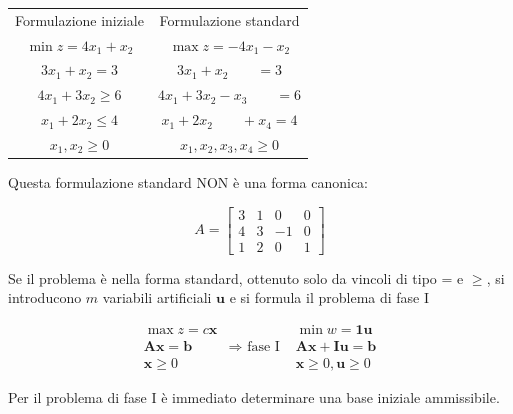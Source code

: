 \documentclass[a4paper, 11pt]{article}
\begin{document}
        \begin{center}
            \begin{tabular}{ c | c }
                Formulazione iniziale & Formulazione standard \\
                
                $\min{z} = 4x_1 + x_2$ & $\max{z} = -4x_1 - x_2$ \\
                
                $3x_1 + x_2 = 3$ & $3x_1 + x_2 \quad \quad = 3$ \\
                
                $4x_1 + 3x_2 \geq 6$ & $4x_1 + 3x_2 - x_3 \quad \quad = 6$ \\
                
                $x_1 + 2x_2 \leq 4$ & $x_1 + 2x_2 \quad \quad + x_4 = 4$ \\
                
                $x_1, x_2 \geq 0$ & $x_1, x_2, x_3, x_4 \geq 0$ \\
            \end{tabular}
        \end{center}

        Questa formulazione standard NON è una forma canonica:
        
        \[
            A = 
            \begin{bmatrix}
                3 & 1 & 0 & 0 \\
                4 & 3 & -1 & 0 \\
                1 & 2 & 0 & 1 
            \end{bmatrix}
        \]

        Se il problema è nella forma standard, ottenuto solo da vincoli di tipo = e $\geq$, si introducono $m$ variabili artificiali $\mathbf{u}$ e si formula il problema di fase I

        $$
            \begin{array}{ccc}
                \max z = c\mathbf{x} & & \min w = \mathbf{1u} \\
                \mathbf{Ax} = \mathbf{b} & \Rightarrow \text{ fase I } & \mathbf{Ax} + \mathbf{Iu} = \mathbf{b} \\
                \mathbf{x} \geq 0 & & \mathbf{x} \geq 0, \mathbf{u} \geq 0
            \end{array}
        $$

        Per il problema di fase I è immediato determinare una base iniziale ammissibile.
\end{document}
